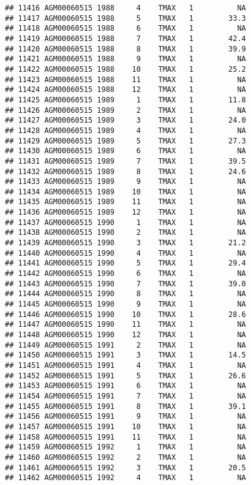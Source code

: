 \documentclass{article}\usepackage[]{graphicx}\usepackage[]{color}
\makeatletter
\newenvironment{kframe}{%
 \def\at@end@of@kframe{}%
 \ifinner\ifhmode%
  \def\at@end@of@kframe{\end{minipage}}%
  \begin{minipage}{\columnwidth}%
 \fi\fi%
 \def\FrameCommand##1{\hskip\@totalleftmargin \hskip-\fboxsep
 \colorbox{shadecolor}{##1}\hskip-\fboxsep
     \hskip-\linewidth \hskip-\@totalleftmargin \hskip\columnwidth}%
 \MakeFramed {\advance\hsize-\width
   \@totalleftmargin\z@ \linewidth\hsize
   \@setminipage}}%
 {\par\unskip\endMakeFramed%
 \at@end@of@kframe}
\newenvironment{knitrout}{}{} %
\makeatother
\begin{document}
\begin{knitrout}
\begin{kframe}
\begin{verbatim}
## 11416 AGM00060515 1988     4    TMAX   1          NA
## 11417 AGM00060515 1988     5    TMAX   1        33.3
## 11418 AGM00060515 1988     6    TMAX   1          NA
## 11419 AGM00060515 1988     7    TMAX   1        42.4
## 11420 AGM00060515 1988     8    TMAX   1        39.9
## 11421 AGM00060515 1988     9    TMAX   1          NA
## 11422 AGM00060515 1988    10    TMAX   1        25.2
## 11423 AGM00060515 1988    11    TMAX   1          NA
## 11424 AGM00060515 1988    12    TMAX   1          NA
## 11425 AGM00060515 1989     1    TMAX   1        11.8
## 11426 AGM00060515 1989     2    TMAX   1          NA
## 11427 AGM00060515 1989     3    TMAX   1        24.0
## 11428 AGM00060515 1989     4    TMAX   1          NA
## 11429 AGM00060515 1989     5    TMAX   1        27.3
## 11430 AGM00060515 1989     6    TMAX   1          NA
## 11431 AGM00060515 1989     7    TMAX   1        39.5
## 11432 AGM00060515 1989     8    TMAX   1        24.6
## 11433 AGM00060515 1989     9    TMAX   1          NA
## 11434 AGM00060515 1989    10    TMAX   1          NA
## 11435 AGM00060515 1989    11    TMAX   1          NA
## 11436 AGM00060515 1989    12    TMAX   1          NA
## 11437 AGM00060515 1990     1    TMAX   1          NA
## 11438 AGM00060515 1990     2    TMAX   1          NA
## 11439 AGM00060515 1990     3    TMAX   1        21.2
## 11440 AGM00060515 1990     4    TMAX   1          NA
## 11441 AGM00060515 1990     5    TMAX   1        29.4
## 11442 AGM00060515 1990     6    TMAX   1          NA
## 11443 AGM00060515 1990     7    TMAX   1        39.0
## 11444 AGM00060515 1990     8    TMAX   1          NA
## 11445 AGM00060515 1990     9    TMAX   1          NA
## 11446 AGM00060515 1990    10    TMAX   1        28.6
## 11447 AGM00060515 1990    11    TMAX   1          NA
## 11448 AGM00060515 1990    12    TMAX   1          NA
## 11449 AGM00060515 1991     2    TMAX   1          NA
## 11450 AGM00060515 1991     3    TMAX   1        14.5
## 11451 AGM00060515 1991     4    TMAX   1          NA
## 11452 AGM00060515 1991     5    TMAX   1        26.6
## 11453 AGM00060515 1991     6    TMAX   1          NA
## 11454 AGM00060515 1991     7    TMAX   1          NA
## 11455 AGM00060515 1991     8    TMAX   1        39.1
## 11456 AGM00060515 1991     9    TMAX   1          NA
## 11457 AGM00060515 1991    10    TMAX   1          NA
## 11458 AGM00060515 1991    11    TMAX   1          NA
## 11459 AGM00060515 1992     1    TMAX   1          NA
## 11460 AGM00060515 1992     2    TMAX   1          NA
## 11461 AGM00060515 1992     3    TMAX   1        20.5
## 11462 AGM00060515 1992     4    TMAX   1          NA

\end{verbatim}
\end{kframe}
\end{knitrout}
\end{document}
